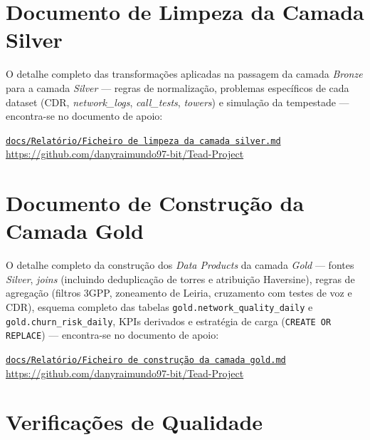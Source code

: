 \documentclass[runningheads]{llncs}
\newcommand{\teadrepo}{https://github.com/danyraimundo97-bit/Tead-Project}
\begin{document}
\clearpage

\section{Documento de Limpeza da Camada Silver}
\label{anexo:silver_cleanup}

O detalhe completo das transformações aplicadas na passagem da camada \textit{Bronze} para a camada \textit{Silver} --- regras de normalização, problemas específicos de cada dataset (CDR, \textit{network\_logs}, \textit{call\_tests}, \textit{towers}) e simulação da tempestade --- encontra-se no documento de apoio:

\begin{center}
\href{\teadrepo/blob/main/docs/Relat%C3%B3rio/Ficheiro%20de%20limpeza%20da%20camada%20silver.md}%
{\texttt{docs/Relatório/Ficheiro de limpeza da camada silver.md}}\\
\small\url{\teadrepo}
\end{center}

\clearpage

\section{Documento de Construção da Camada Gold}
\label{anexo:gold_build}

O detalhe completo da construção dos \textit{Data Products} da camada \textit{Gold} --- fontes \textit{Silver}, \textit{joins} (incluindo deduplicação de torres e atribuição Haversine), regras de agregação (filtros 3GPP, zoneamento de Leiria, cruzamento com testes de voz e CDR), esquema completo das tabelas \texttt{gold.network\_quality\_daily} e \texttt{gold.churn\_risk\_daily}, KPIs derivados e estratégia de carga (\texttt{CREATE OR REPLACE}) --- encontra-se no documento de apoio:

\begin{center}
\href{\teadrepo/blob/main/docs/Relat%C3%B3rio/Ficheiro%20de%20constru%C3%A7%C3%A3o%20da%20camada%20gold.md}%
{\texttt{docs/Relatório/Ficheiro de construção da camada gold.md}}\\
\small\url{\teadrepo}
\end{center}

\clearpage

\section{Verificações de Qualidade}
\label{anexo:qa_checks}
\end{document}
